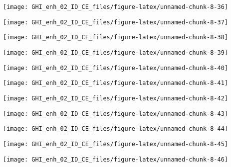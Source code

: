 \documentclass[
  10pt,
  a4paper,oneside]{article}
\begin{document}
\begin{center}\texttt{[image: GHI\_enh\_02\_ID\_CE\_files/figure-latex/unnamed-chunk-8-36]} \end{center}

\begin{center}\texttt{[image: GHI\_enh\_02\_ID\_CE\_files/figure-latex/unnamed-chunk-8-37]} \end{center}

\begin{center}\texttt{[image: GHI\_enh\_02\_ID\_CE\_files/figure-latex/unnamed-chunk-8-38]} \end{center}

\begin{center}\texttt{[image: GHI\_enh\_02\_ID\_CE\_files/figure-latex/unnamed-chunk-8-39]} \end{center}

\begin{center}\texttt{[image: GHI\_enh\_02\_ID\_CE\_files/figure-latex/unnamed-chunk-8-40]} \end{center}

\begin{center}\texttt{[image: GHI\_enh\_02\_ID\_CE\_files/figure-latex/unnamed-chunk-8-41]} \end{center}

\begin{center}\texttt{[image: GHI\_enh\_02\_ID\_CE\_files/figure-latex/unnamed-chunk-8-42]} \end{center}

\begin{center}\texttt{[image: GHI\_enh\_02\_ID\_CE\_files/figure-latex/unnamed-chunk-8-43]} \end{center}

\begin{center}\texttt{[image: GHI\_enh\_02\_ID\_CE\_files/figure-latex/unnamed-chunk-8-44]} \end{center}

\begin{center}\texttt{[image: GHI\_enh\_02\_ID\_CE\_files/figure-latex/unnamed-chunk-8-45]} \end{center}

\begin{center}\texttt{[image: GHI\_enh\_02\_ID\_CE\_files/figure-latex/unnamed-chunk-8-46]} \end{center}
\end{document}
